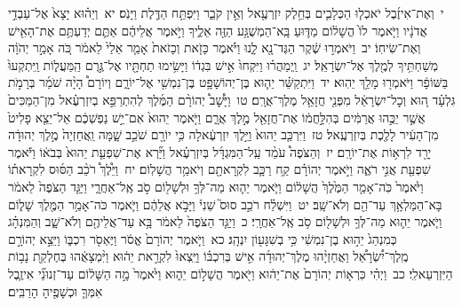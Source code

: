 \documentclass[18pt]{article}
\newcommand{\vart}[1]{\Bfootnote{#1}}	%
\newcommand{\kri}[1]{\Afootnote{#1}}	%
\begin{document}
 {\loc י~}וְאֶת־אִיזֶ֜בֶל יֹאכְל֧וּ הַכְּלָבִ֛ים בְּחֵ֥לֶק יִזְרְעֶ֖אל וְאֵ֣ין קֹבֵ֑ר וַיִּפְתַּ֥ח הַדֶּ֖לֶת וַיָּנֹֽס׃ \startlock
 {\loc יא~}וְיֵה֗וּא יָצָא֙ אֶל־עַבְדֵ֣י אֲדֹנָ֔יו וַיֹּ֤אמֶר לוֹ֙ הֲשָׁל֔וֹם מַדּ֛וּעַ בָּֽא־הַמְשֻׁגָּ֥ע הַזֶּ֖ה אֵלֶ֑יךָ וַיֹּ֣אמֶר אֲלֵיהֶ֔ם אַתֶּ֛ם יְדַעְתֶּ֥ם אֶת־הָאִ֖ישׁ וְאֶת־שִׂיחֽוֹ׃ \startlock
 {\loc יב~}וַיֹּאמְר֣וּ שֶׁ֔קֶר הַגֶּד־נָ֖א לָ֑נוּ וַיֹּ֗אמֶר כָּזֹ֤את וְכָזֹאת֙ אָמַ֤ר אֵלַי֙ לֵאמֹ֔ר כֹּ֚ה אָמַ֣ר יְהֹוָ֔ה מְשַׁחְתִּ֥יךָ לְמֶ֖לֶךְ אֶל־יִשְׂרָאֵֽל׃ \startlock
 {\loc יג~}וַֽיְמַהֲר֗וּ וַיִּקְחוּ֙ אִ֣ישׁ בִּגְד֔וֹ וַיָּשִׂ֥ימוּ תַחְתָּ֖יו אֶל־גֶּ֣רֶם הַֽמַּעֲל֑וֹת וַֽיִּתְקְעוּ֙ בַּשּׁוֹפָ֔ר וַיֹּאמְר֖וּ מָלַ֥ךְ יֵהֽוּא׃ \startlock
 {\loc יד~}וַיִּתְקַשֵּׁ֗ר יֵה֛וּא בֶּן־יְהוֹשָׁפָ֥ט בֶּן־נִמְשִׁ֖י אֶל־יוֹרָ֑ם וְיוֹרָם֩ הָיָ֨ה שֹׁמֵ֜ר בְּרָמֹ֣ת גִּלְעָ֗ד ה֚וּא וְכׇל־יִשְׂרָאֵ֔ל מִפְּנֵ֖י חֲזָאֵ֥ל מֶלֶךְ־אֲרָֽם׃ \startlock
 {\loc טו~}וַיָּ֩שׇׁב֩ יְהוֹרָ֨ם הַמֶּ֜לֶךְ לְהִתְרַפֵּ֣א בְיִזְרְעֶ֗אל מִן־הַמַּכִּים֙ אֲשֶׁ֣ר יַכֻּ֣הוּ אֲרַמִּ֔ים בְּהִלָּ֣חֲמ֔וֹ אֶת־חֲזָאֵ֖ל מֶ֣לֶךְ אֲרָ֑ם וַיֹּ֤אמֶר יֵהוּא֙ אִם־יֵ֣שׁ נַפְשְׁכֶ֔ם אַל־יֵצֵ֤א פָלִיט֙ מִן־הָעִ֔יר לָלֶ֖כֶת  \edtext{(לגיד)}{\kri{קרי: לְהַגִּ֥יד}}  בְּיִזְרְעֶֽאל׃ \startlock
 {\loc טז~}וַיִּרְכַּ֤ב יֵהוּא֙ וַיֵּ֣לֶךְ יִזְרְעֶ֔אלָה כִּ֥י יוֹרָ֖ם שֹׁכֵ֣ב שָׁ֑מָּה וַֽאֲחַזְיָה֙ מֶ֣לֶךְ יְהוּדָ֔ה יָרַ֖ד לִרְא֥וֹת אֶת־יוֹרָֽם׃ \startlock
 {\loc יז~}וְהַצֹּפֶה֩ עֹמֵ֨ד עַֽל־הַמִּגְדָּ֜ל בְּיִזְרְעֶ֗אל וַיַּ֞רְא אֶת־שִׁפְעַ֤ת יֵהוּא֙ בְּבֹא֔וֹ וַיֹּ֕אמֶר שִׁפְעַ֖ת אֲנִ֣י רֹאֶ֑ה וַיֹּ֣אמֶר יְהוֹרָ֗ם קַ֥ח רַכָּ֛ב  \edtext{וּֽשְׁלַ֥ח}{\vart{א=וּֽשֲׁלַ֥ח | }}  לִקְרָאתָ֖ם וְיֹאמַ֥ר הֲשָׁלֽוֹם׃ \startlock
 {\loc יח~}וַיֵּ֩לֶךְ֩ רֹכֵ֨ב הַסּ֜וּס לִקְרָאת֗וֹ וַיֹּ֙אמֶר֙ כֹּֽה־אָמַ֤ר הַמֶּ֙לֶךְ֙ הֲשָׁל֔וֹם וַיֹּ֧אמֶר יֵה֛וּא מַה־לְּךָ֥ וּלְשָׁל֖וֹם סֹ֣ב אֶֽל־אַחֲרָ֑י וַיַּגֵּ֤ד הַצֹּפֶה֙ לֵאמֹ֔ר בָּא־הַמַּלְאָ֥ךְ עַד־הֵ֖ם וְלֹא־שָֽׁב׃ \startlock
 {\loc יט~}וַיִּשְׁלַ֗ח רֹכֵ֣ב סוּס֮ שֵׁנִי֒ וַיָּבֹ֣א אֲלֵהֶ֔ם וַיֹּ֛אמֶר כֹּה־אָמַ֥ר הַמֶּ֖לֶךְ שָׁל֑וֹם וַיֹּ֧אמֶר יֵה֛וּא מַה־לְּךָ֥ וּלְשָׁל֖וֹם סֹ֥ב אֶֽל־אַחֲרָֽי׃ \startlock
 {\loc כ~}וַיַגֵּ֤ד הַצֹּפֶה֙ לֵאמֹ֔ר בָּ֥א עַד־אֲלֵיהֶ֖ם וְלֹא־שָׁ֑ב וְהַמִּנְהָ֗ג כְּמִנְהַג֙ יֵה֣וּא בֶן־נִמְשִׁ֔י כִּ֥י בְשִׁגָּע֖וֹן יִנְהָֽג׃ \startlock
 {\loc כא~}וַיֹּ֤אמֶר יְהוֹרָם֙ אֱסֹ֔ר וַיֶּאְסֹ֖ר רִכְבּ֑וֹ וַיֵּצֵ֣א יְהוֹרָ֣ם מֶֽלֶךְ־יִ֠שְׂרָאֵ֠ל וַאֲחַזְיָ֨הוּ מֶלֶךְ־יְהוּדָ֜ה אִ֣ישׁ בְּרִכְבּ֗וֹ וַיֵּֽצְאוּ֙ לִקְרַ֣את יֵה֔וּא וַיִּ֨מְצָאֻ֔הוּ בְּחֶלְקַ֖ת נָב֥וֹת הַיִּזְרְעֵאלִֽי׃ \startlock
 {\loc כב~}וַיְהִ֗י כִּרְא֤וֹת יְהוֹרָם֙ אֶת־יֵה֔וּא וַיֹּ֖אמֶר הֲשָׁל֣וֹם יֵה֑וּא וַיֹּ֙אמֶר֙ מָ֣ה הַשָּׁל֔וֹם עַד־זְנוּנֵ֞י אִיזֶ֧בֶל אִמְּךָ֛ וּכְשָׁפֶ֖יהָ הָרַבִּֽים׃ \startlock
\end{document}
